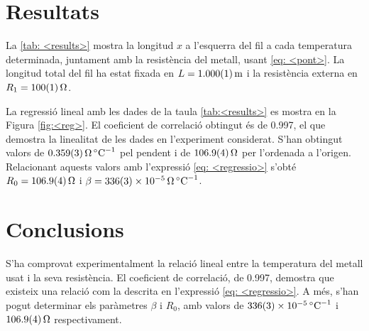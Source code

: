 \section{Resultats}

La \ref{tab: <results>} mostra la longitud $x$ a l'esquerra del fil a cada temperatura determinada, juntament amb la resistència del metall, usant \ref{eq: <pont>}. La longitud total del fil ha estat fixada en $L=\data{1.000}{0.001}{\meter}$ i la resistència externa en $R_1=\data{100}{1}{\ohm}$.

La regressió lineal amb les dades de la taula \cref{tab:<results>} es mostra en la Figura \ref{fig:<reg>}. El coeficient de correlació obtingut és de 0.997, el que demostra la linealitat de les dades en l'experiment considerat. S'han obtingut valors de $\data{0.359}{0.003}{\ohm\per\celsius}$ pel pendent i de $\data{106.9}{0.4}{\ohm}$ per l'ordenada a l'origen. Relacionant aquests valors amb l'expressió \cref{eq: <regressio>} s'obté $R_0=\data{106.9}{0.4}{\ohm}$ i $\beta=\data{336}{3e-5}{\ohm\per\celsius}$.

\section{Conclusions}
S'ha comprovat experimentalment la relació lineal entre la temperatura del metall usat i la seva resistència. El coeficient de correlació, de 0.997, demostra que existeix una relació com la descrita en l'expressió \ref{eq: <regressio>}. A més, s'han pogut determinar els paràmetres $\beta$ i $R_0$, amb valors de $\data{336}{3e-5}{\per\celsius}$ i $\data{106.9}{0.4}{\ohm}$ respectivament.








